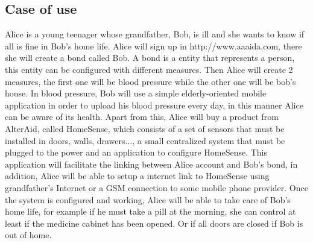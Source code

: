 \subsection{Case of use}\label{SS:Case-Of-Use}
Alice is a young teenager whose grandfather, Bob, is ill and she wants to know if all is fine in Bob's home life. Alice will sign up in http://www.aaaida.com, there she will create a bond called Bob. A bond is a entity that represents a person, this entity can be configured with different measures. Then Alice will create 2 measures, the first one will be blood pressure while the other one will be bob's house.
In blood pressure, Bob will use a simple elderly-oriented mobile application in order to upload his blood pressure every day, in this manner Alice can be aware of its health.
Apart from this, Alice will buy a product from AlterAid, called HomeSense, which consists of a set of sensors that must be installed in doors, walls, drawers..., a small centralized system that must be plugged to the power and an application to configure HomeSense.
This application will facilitate the linking between Alice account and Bob's bond, in addition, Alice will be able to setup a internet link to HomeSense using grandfather's Internet or a GSM connection to some mobile phone provider.
Once the system is configured and working, Alice will be able to take care of Bob's home life, for example if he must take a pill at the morning, she can control at least if the medicine cabinet has been opened. Or if all doors are closed if Bob is out of home.


